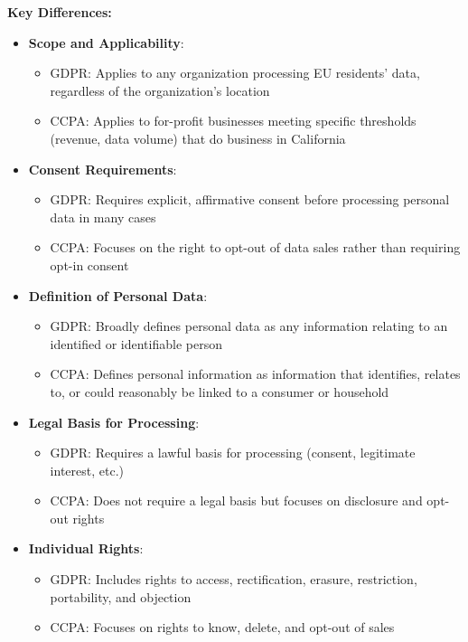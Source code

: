 \documentclass[12pt]{article}
\begin{document}
\begin{enumerate}
\begin{tcolorbox}[colback=blue!5!white,colframe=blue!75!black,title={Solution}]
    \textbf{Key Differences:}
    
    \begin{itemize}
        \item \textbf{Scope and Applicability}:
          \begin{itemize}
              \item GDPR: Applies to any organization processing EU residents' data, regardless of the organization's location
              \item CCPA: Applies to for-profit businesses meeting specific thresholds (revenue, data volume) that do business in California
          \end{itemize}
        
        \item \textbf{Consent Requirements}:
          \begin{itemize}
              \item GDPR: Requires explicit, affirmative consent before processing personal data in many cases
              \item CCPA: Focuses on the right to opt-out of data sales rather than requiring opt-in consent
          \end{itemize}
        
        \item \textbf{Definition of Personal Data}:
          \begin{itemize}
              \item GDPR: Broadly defines personal data as any information relating to an identified or identifiable person
              \item CCPA: Defines personal information as information that identifies, relates to, or could reasonably be linked to a consumer or household
          \end{itemize}
        
        \item \textbf{Legal Basis for Processing}:
          \begin{itemize}
              \item GDPR: Requires a lawful basis for processing (consent, legitimate interest, etc.)
              \item CCPA: Does not require a legal basis but focuses on disclosure and opt-out rights
          \end{itemize}
        
        \item \textbf{Individual Rights}:
          \begin{itemize}
              \item GDPR: Includes rights to access, rectification, erasure, restriction, portability, and objection
              \item CCPA: Focuses on rights to know, delete, and opt-out of sales
          \end{itemize}
    \end{itemize}
    

\end{tcolorbox}
\end{enumerate}
\end{document}
